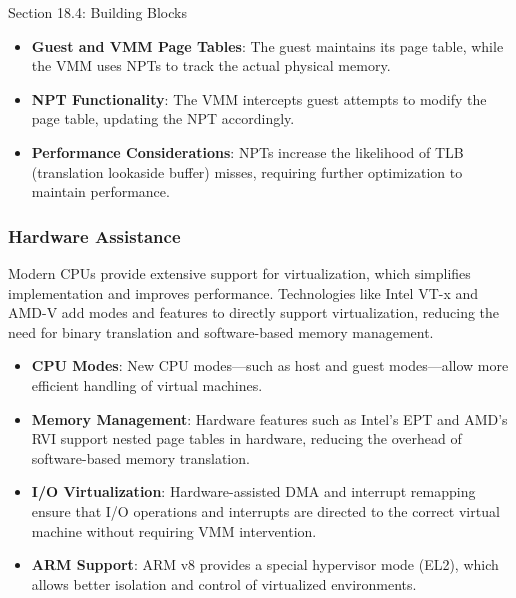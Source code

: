 \begin{notes}{Section 18.4: Building Blocks}
    \begin{highlight}
    
        \begin{itemize}
            \item \textbf{Guest and VMM Page Tables}: The guest maintains its page table, while the VMM uses NPTs to track the actual physical memory.
            \item \textbf{NPT Functionality}: The VMM intercepts guest attempts to modify the page table, updating the NPT accordingly.
            \item \textbf{Performance Considerations}: NPTs increase the likelihood of TLB (translation lookaside buffer) misses, requiring further optimization to maintain performance.
        \end{itemize}
    
    \end{highlight}
    
    \subsubsection*{Hardware Assistance}
    
    Modern CPUs provide extensive support for virtualization, which simplifies implementation and improves performance. Technologies like Intel VT-x and AMD-V add modes and features to directly support 
    virtualization, reducing the need for binary translation and software-based memory management.
    
    \begin{highlight}
    
        \begin{itemize}
            \item \textbf{CPU Modes}: New CPU modes—such as host and guest modes—allow more efficient handling of virtual machines.
            \item \textbf{Memory Management}: Hardware features such as Intel's EPT and AMD's RVI support nested page tables in hardware, reducing the overhead of software-based memory translation.
            \item \textbf{I/O Virtualization}: Hardware-assisted DMA and interrupt remapping ensure that I/O operations and interrupts are directed to the correct virtual machine without requiring VMM intervention.
            \item \textbf{ARM Support}: ARM v8 provides a special hypervisor mode (EL2), which allows better isolation and control of virtualized environments.
        \end{itemize}
    

\end{highlight}
\end{notes}
